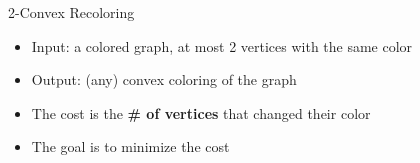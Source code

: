 \begin{frame}{2-Convex Recoloring}
\begin{itemize}


\item
Input: a colored graph, at most 2 vertices with the same color

\pause\item
Output: (any) convex coloring of the graph

\pause\item
The cost is the \textbf{\# of vertices} that changed their color

\pause\item
The goal is to minimize the cost


\end{itemize}
\pause
\end{frame}
